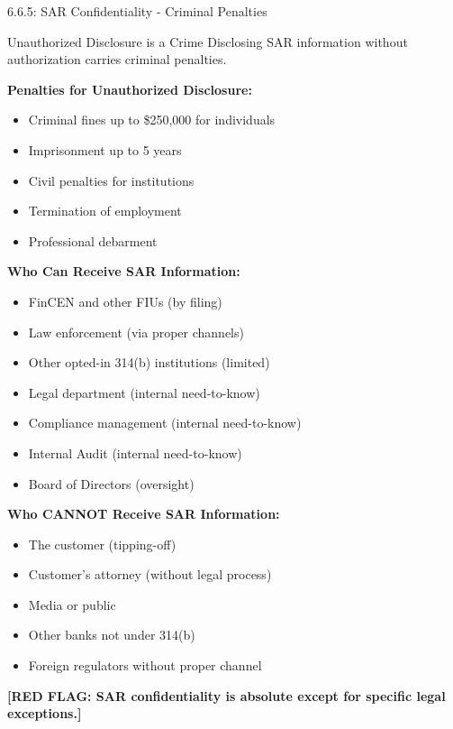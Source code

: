 \documentclass[11pt,a4paper]{beamer}
\newcommand{\redflag}[1]{\textcolor{red!80!black}{\textbf{[RED FLAG: #1]}}}
\begin{document}
\begin{frame}{6.6.5: SAR Confidentiality - Criminal Penalties}
	\begin{block}{Unauthorized Disclosure is a Crime}
		Disclosing SAR information without authorization carries criminal penalties.
	\end{block}
	\textbf{Penalties for Unauthorized Disclosure:}
	\begin{itemize}
		\item Criminal fines up to \$250,000 for individuals
		\item Imprisonment up to 5 years
		\item Civil penalties for institutions
		\item Termination of employment
		\item Professional debarment
	\end{itemize}
	\textbf{Who Can Receive SAR Information:}
	\begin{itemize}
		\item FinCEN and other FIUs (by filing)
		\item Law enforcement (via proper channels)
		\item Other opted-in 314(b) institutions (limited)
		\item Legal department (internal need-to-know)
		\item Compliance management (internal need-to-know)
		\item Internal Audit (internal need-to-know)
		\item Board of Directors (oversight)
	\end{itemize}
	\textbf{Who CANNOT Receive SAR Information:}
	\begin{itemize}
		\item The customer (tipping-off)
		\item Customer's attorney (without legal process)
		\item Media or public
		\item Other banks not under 314(b)
		\item Foreign regulators without proper channel
	\end{itemize}
	\redflag{SAR confidentiality is absolute except for specific legal exceptions.}
\end{frame}
\end{document}
